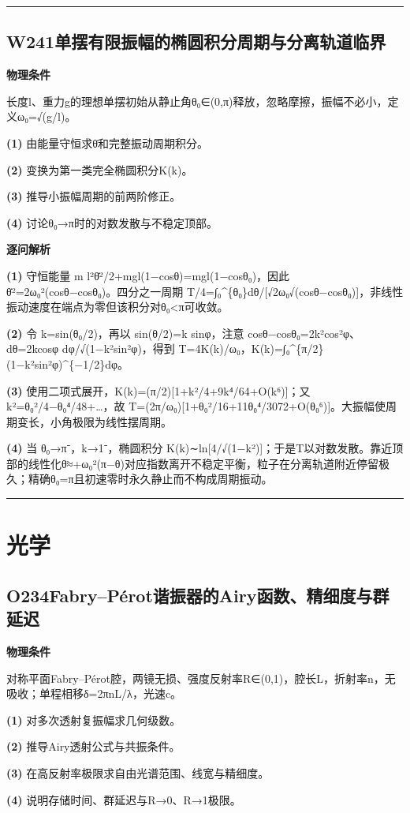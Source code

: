 \documentclass[UTF8,a4paper,11pt,oneside,openany]{ctexbook}
\begin{document}
\par\bigskip\hrule\bigskip
\section*{W241\quad 单摆有限振幅的椭圆积分周期与分离轨道临界}
\textbf{物理条件}\par 长度l、重力g的理想单摆初始从静止角θ₀∈(0,π)释放，忽略摩擦，振幅不必小，定义ω₀=√(g/l)。
\par\noindent\textbf{(1)} 由能量守恒求θ̇和完整振动周期积分。
\par\noindent\textbf{(2)} 变换为第一类完全椭圆积分K(k)。
\par\noindent\textbf{(3)} 推导小振幅周期的前两阶修正。
\par\noindent\textbf{(4)} 讨论θ₀→π时的对数发散与不稳定顶部。

\par\medskip\noindent\textbf{逐问解析}
\par\noindent\textbf{(1)} 守恒能量 m l²θ̇²/2+mgl(1−cosθ)=mgl(1−cosθ₀)，因此 θ̇²=2ω₀²(cosθ−cosθ₀)。四分之一周期 T/4=∫₀\textasciicircum{}\{θ₀\}dθ/[√2ω₀√(cosθ−cosθ₀)]，非线性振动速度在端点为零但该积分对θ₀<π可收敛。
\par\noindent\textbf{(2)} 令 k=sin(θ₀/2)，再以 sin(θ/2)=k sinφ，注意 cosθ−cosθ₀=2k²cos²φ、dθ=2kcosφ dφ/√(1−k²sin²φ)，得到 T=4K(k)/ω₀，K(k)=∫₀\textasciicircum{}\{π/2\}(1−k²sin²φ)\textasciicircum{}\{−1/2\}dφ。
\par\noindent\textbf{(3)} 使用二项式展开，K(k)=(π/2)[1+k²/4+9k⁴/64+O(k⁶)]；又 k²=θ₀²/4−θ₀⁴/48+…，故 T=(2π/ω₀)[1+θ₀²/16+11θ₀⁴/3072+O(θ₀⁶)]。大振幅使周期变长，小角极限为线性摆周期。
\par\noindent\textbf{(4)} 当 θ₀→π⁻，k→1⁻，椭圆积分 K(k)∼ln[4/√(1−k²)]；于是T以对数发散。靠近顶部的线性化θ̈≈+ω₀²(π−θ)对应指数离开不稳定平衡，粒子在分离轨道附近停留极久；精确θ₀=π且初速零时永久静止而不构成周期振动。

\par\bigskip\hrule\bigskip
\chapter{光学}
\section*{O234\quad Fabry–Pérot谐振器的Airy函数、精细度与群延迟}
\textbf{物理条件}\par 对称平面Fabry–Pérot腔，两镜无损、强度反射率R∈(0,1)，腔长L，折射率n，无吸收；单程相移δ=2πnL/λ，光速c。
\par\noindent\textbf{(1)} 对多次透射复振幅求几何级数。
\par\noindent\textbf{(2)} 推导Airy透射公式与共振条件。
\par\noindent\textbf{(3)} 在高反射率极限求自由光谱范围、线宽与精细度。
\par\noindent\textbf{(4)} 说明存储时间、群延迟与R→0、R→1极限。
\end{document}
